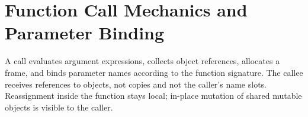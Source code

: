 \section{Function Call Mechanics and Parameter Binding}

A call evaluates argument expressions, collects object references, allocates a frame, and binds parameter names according to the function signature. The callee receives references to objects, not copies and not the caller's name slots. Reassignment inside the function stays local; in-place mutation of shared mutable objects is visible to the caller.
